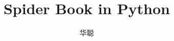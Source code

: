 \documentclass[11pt,UTF8,oneside]{mybook}
\begin{document}
\setlength{\parindent}{2em} \title{Spider Book in Python} \author{华聪}
\date{} \setlength{\parskip}{5pt} \setlength{\baselineskip}{1.5em}

\maketitle
\frontmatter

\tableofcontents
\mainmatter






\end{document}
